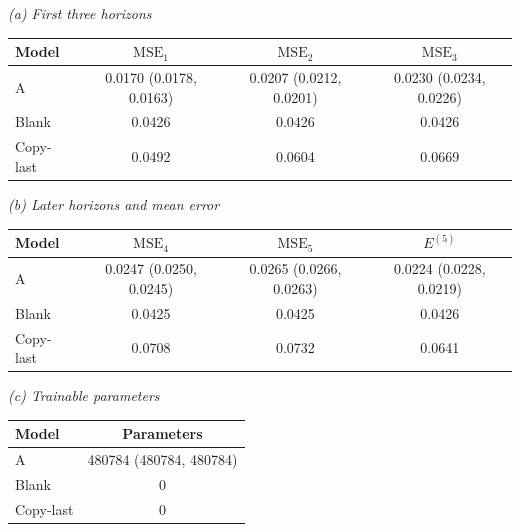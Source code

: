 {\small\textit{(a) First three horizons}}\par\vspace{2pt}
\par\begingroup\centering\fontsize{8.5}{10.5}\selectfont\setlength{\parskip}{0pt}\setlength{\tabcolsep}{4pt}
\begin{tabular}{@{}lccc@{}}
\toprule
Model & $\mathrm{MSE}_1$ & $\mathrm{MSE}_2$ & $\mathrm{MSE}_3$ \\
\midrule
A & 0.0170 (0.0178, 0.0163) & 0.0207 (0.0212, 0.0201) & 0.0230 (0.0234, 0.0226) \\
Blank & 0.0426 & 0.0426 & 0.0426 \\
Copy-last & 0.0492 & 0.0604 & 0.0669 \\
\bottomrule
\end{tabular}\par\endgroup\vspace{5pt}
{\small\textit{(b) Later horizons and mean error}}\par\vspace{2pt}
\par\begingroup\centering\fontsize{8.5}{10.5}\selectfont\setlength{\parskip}{0pt}\setlength{\tabcolsep}{4pt}
\begin{tabular}{@{}lccc@{}}
\toprule
Model & $\mathrm{MSE}_4$ & $\mathrm{MSE}_5$ & $E^{(5)}$ \\
\midrule
A & 0.0247 (0.0250, 0.0245) & 0.0265 (0.0266, 0.0263) & 0.0224 (0.0228, 0.0219) \\
Blank & 0.0425 & 0.0425 & 0.0426 \\
Copy-last & 0.0708 & 0.0732 & 0.0641 \\
\bottomrule
\end{tabular}\par\endgroup\vspace{5pt}
{\small\textit{(c) Trainable parameters}}\par\vspace{2pt}
\par\begingroup\centering\fontsize{8.5}{10.5}\selectfont\setlength{\parskip}{0pt}\setlength{\tabcolsep}{4pt}
\begin{tabular}{@{}lc@{}}
\toprule
Model & Parameters \\
\midrule
A & 480784 (480784, 480784) \\
Blank & 0 \\
Copy-last & 0 \\
\bottomrule
\end{tabular}\par\endgroup\vspace{5pt}
